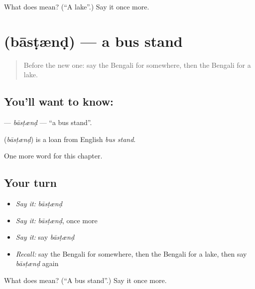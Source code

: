 \begin{tcolorbox}[breakable,colback=teal!4,colframe=teal!35!black,title={Before you move on}]
What does  mean? (\textquotedblleft{}A lake\textquotedblright{}.) Say it once more.
\end{tcolorbox}
\section[\texorpdfstring{\bn{বাসস্ট্যান্ড} (bāsṭænḍ)}{বাসস্ট্যান্ড (bāsṭænḍ)}]{ (bāsṭænḍ) — a bus stand}

\label{lesson:BN-C217-bastnd}



\begin{quote}
Before the new one: say the Bengali for somewhere, then the Bengali for a lake.
\end{quote}

\subsection*{You'll want to know: }
\textbf{} — \emph{bāsṭænḍ} — \textquotedblleft{}a bus stand\textquotedblright{}.

\begin{cousinweb}
\textbf{} (\emph{bāsṭænḍ}) is a loan from English \emph{bus stand}.
\end{cousinweb}

\begin{grammarlens}[title={What you've built}]
One more word for this chapter.
\end{grammarlens}

\subsection*{Your turn}
\begin{itemize}
\raggedright
  \item \emph{Say it:} \emph{bāsṭænḍ}
  \item \emph{Say it:} \emph{bāsṭænḍ}, once more
  \item \emph{Say it:} say \emph{bāsṭænḍ}
  \item \emph{Recall:} say the Bengali for somewhere, then the Bengali for a lake, then say \emph{bāsṭænḍ} again
\end{itemize}

\begin{tcolorbox}[breakable,colback=teal!4,colframe=teal!35!black,title={Before you move on}]
What does  mean? (\textquotedblleft{}A bus stand\textquotedblright{}.) Say it once more.
\end{tcolorbox}
